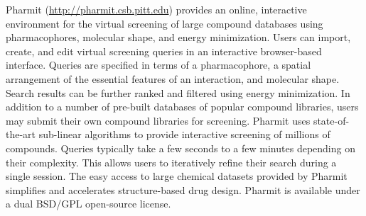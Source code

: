 Pharmit (\url{http://pharmit.csb.pitt.edu}) provides an online, interactive environment for the virtual screening of large compound databases using pharmacophores, molecular shape, and energy minimization.  Users can import, create, and edit virtual screening queries in an interactive browser-based interface.  Queries are specified in terms of a pharmacophore, a spatial arrangement of the essential features of an interaction, and molecular shape.  Search results can be further ranked and filtered using energy minimization.  
In addition to a number of pre-built databases of popular compound libraries, users may submit their own compound libraries for screening.  Pharmit uses state-of-the-art sub-linear algorithms to provide interactive screening of millions of compounds. Queries typically take a few seconds to a few minutes depending on their complexity. This allows users to iteratively refine their search during a single session.  The easy access to large chemical datasets provided by Pharmit simplifies and accelerates structure-based drug design.  Pharmit is available under a dual BSD/GPL open-source license.

